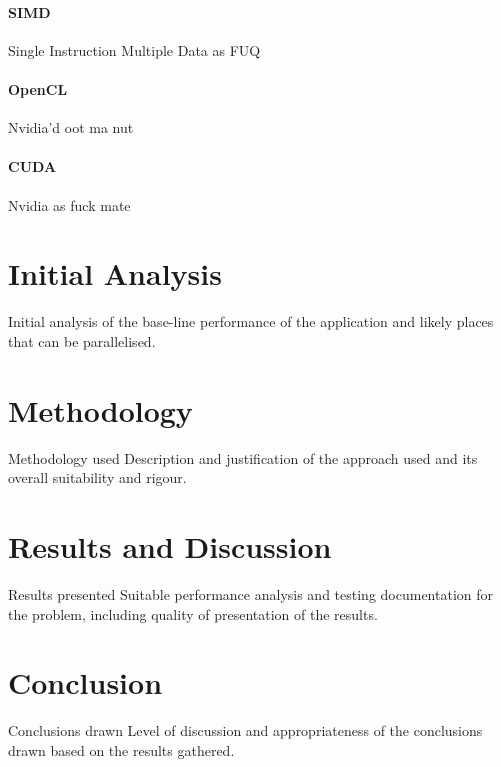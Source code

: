 \documentclass[12pt, conference]{article}
\begin{document}
\paragraph{SIMD\\}
Single Instruction Multiple Data as FUQ

\paragraph{OpenCL\\}
Nvidia'd oot ma nut 

\paragraph{CUDA\\}
Nvidia as fuck mate

\section{Initial Analysis}
Initial analysis of the base-line performance of the application and likely places that can be parallelised.

\section{Methodology}
Methodology used
Description and justification of the approach used and its overall suitability and rigour.

\section{Results and Discussion}
Results presented
Suitable performance analysis and testing documentation for the problem, including quality of presentation of the results.

\section{Conclusion}
Conclusions drawn
Level of discussion and appropriateness of the conclusions drawn based on the results gathered.




\end{document}
